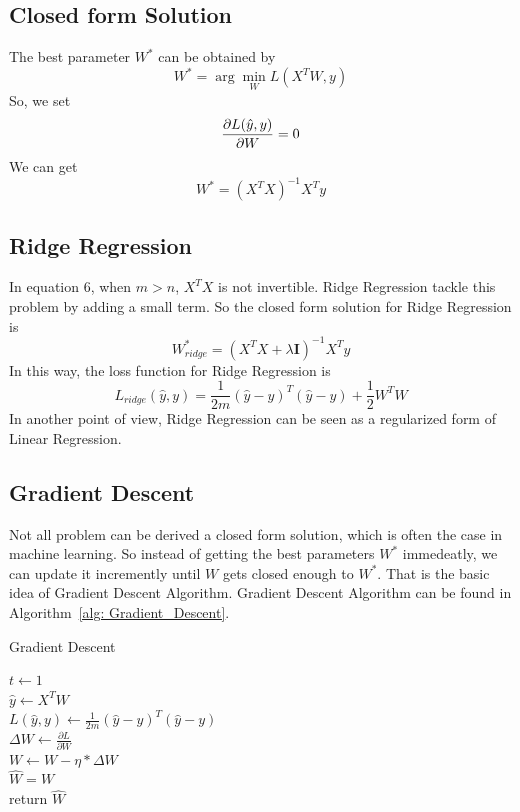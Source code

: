 \documentclass[journal, a4paper]{IEEEtran}
\begin{document}
\subsection{Closed form Solution}
The best parameter $W^{*}$ can be obtained by \\
\begin{equation}
 W^{*} = \arg\min_{W}L(X^{T}W, y)  
\end{equation}
So, we set 
\begin{equation}
\frac{\partial L(\hat{y}, y)}{\partial W} = 0 \\
\end{equation}
We can get 
\begin{equation}
W^{*} = (X^{T}X)^{-1}X^{T}y
\end{equation}
\subsection{Ridge Regression}
In equation 6, when $m > n$, $X^{T}X$ is not invertible. Ridge Regression tackle this problem by adding a small term. So the closed form solution for Ridge Regression is
\begin{equation}
W_{ridge}^{*} = (X^{T}X + \lambda \mathbf{I})^{-1}X^{T}y
\end{equation}
In this way, the loss function for Ridge Regression is
\begin{equation}
L_{ridge}(\hat{y}, y) = \frac{1}{2m}(\hat{y} - y)^{T}(\hat{y} - y)  + \frac{1}{2} W^{T} W
\end{equation}
In another point of view, Ridge Regression can be seen as a regularized form of Linear Regression.
\subsection{Gradient Descent}
Not all problem can be derived a closed form solution, which is often the case in machine learning. So instead of getting the best parameters $W^{*}$ immedeatly, we can update it incremently until $W$ gets closed enough to $W^{*}$. That is the basic idea of Gradient Descent Algorithm. Gradient Descent Algorithm can be found in Algorithm~\ref{alg: Gradient_Descent}. 
\begin{algorithm}

	\label{alg: Gradient_Descent}
	\caption{Gradient Descent}
	$t \gets 1$ \\
	{
		$\hat{y} \gets X^{T}W $ \\
		$ L(\hat{y}, y) \gets \frac{1}{2m}(\hat{y} - y)^{T}(\hat{y} - y)$ \\
		$\Delta{W} \gets \frac{\partial L}{\partial W}$ \\
		$W \gets W - \eta * \Delta{W}$ \\
	}
	$\hat{W} = W$ \\
	return $\hat{W}$
\end{algorithm}
\end{document}
